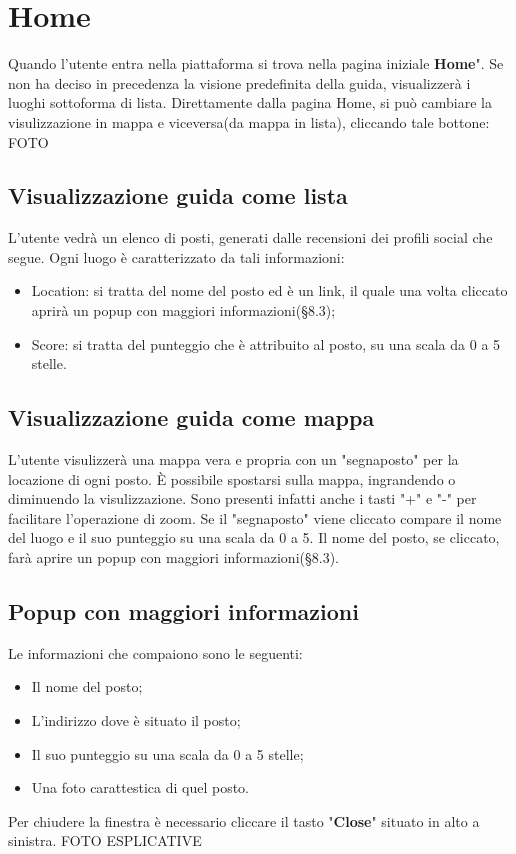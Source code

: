 \section{Home} {
    Quando l'utente entra nella piattaforma si trova nella pagina iniziale \textbf{Home}". \aCapo
    Se non ha deciso in precedenza la visione predefinita della guida, visualizzerà i luoghi sottoforma di lista. 
    Direttamente dalla pagina Home, si può cambiare la visulizzazione in mappa e viceversa(da mappa in lista), cliccando tale bottone:
    FOTO

    \subsection{Visualizzazione guida come lista} {
        L'utente vedrà un elenco di posti, generati dalle recensioni dei profili social che segue. \aCapo
        Ogni luogo è caratterizzato da tali informazioni: 
        \begin{itemize}
            \item Location: si tratta del nome del posto ed è un link, il quale una volta cliccato aprirà un popup con maggiori informazioni(§8.3); 
            \item Score: si tratta del punteggio che è attribuito al posto, su una scala da 0 a 5 stelle.
        \end{itemize}       
    }

    \subsection{Visualizzazione guida come mappa} {
        L'utente visulizzerà una mappa vera e propria con un "segnaposto" per la locazione di ogni posto. È possibile spostarsi sulla mappa, ingrandendo o diminuendo la visulizzazione. 
        Sono presenti infatti anche i tasti "+" e "-" per facilitare l'operazione di zoom. \aCapo
        Se il "segnaposto" viene cliccato compare il nome del luogo e il suo punteggio su una scala da 0 a 5. Il nome del posto, se cliccato, farà aprire un popup con maggiori informazioni(§8.3).

    }

    \subsection{Popup con maggiori informazioni} {
        Le informazioni che compaiono sono le seguenti:
        \begin{itemize}
            \item Il nome del posto;
            \item L'indirizzo dove è situato il posto;
            \item Il suo punteggio su una scala da 0 a 5 stelle;
            \item Una foto carattestica di quel posto.
        \end{itemize}

        Per chiudere la finestra è necessario cliccare il tasto "\textbf{Close}" situato in alto a sinistra.
        FOTO ESPLICATIVE
    }
}
